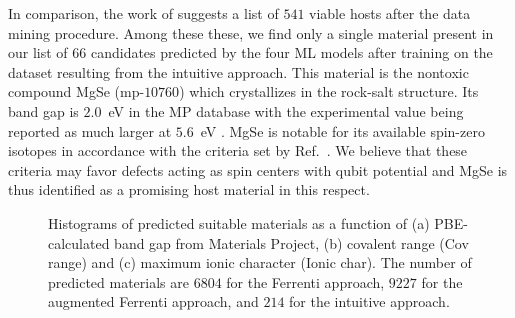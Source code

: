 \documentclass[superscriptaddress,unsortedaddress,
 amsmath,amssymb,
 aps,
]{revtex4-2}
\newcommand{\oliver}[1]{\textcolor{violet}{#1}}
\begin{document}
In comparison, the work of \citeauthor{Ferrenti2020} \cite{Ferrenti2020} suggests a list of $541$ viable hosts after the data mining procedure.  
Among these these, we find only a single material present in our list of $66$ candidates predicted by the four ML models after training on the dataset resulting from the intuitive approach. This material is the nontoxic compound MgSe (mp-$10760$) which crystallizes in the rock-salt structure. Its band gap is $2.0$~eV in the MP database with the experimental value being reported as much larger at $5.6$~eV  \cite{SaumGeorge1959}.  MgSe is notable for its available spin-zero isotopes in accordance with the criteria set by \citeauthor{Ferrenti2020} Ref.~\cite{Ferrenti2020}. We believe that these criteria may favor defects acting as spin centers with qubit potential and MgSe is thus identified as a promising host material in this respect.   

\begin{figure}%
    \centering
    \begin{subfigure}{1\textwidth}
        \centering
        
        \subcaption[]{}
    \end{subfigure}%

    
    \begin{subfigure}{1\textwidth}
        \centering
        
        \subcaption[]{}
    \end{subfigure}

    \begin{subfigure}{1\textwidth}
        \centering
        
        \subcaption[]{}
    \end{subfigure}
    
    \caption{Histograms of predicted suitable materials as a function of (a) PBE-calculated band gap from Materials Project, (b) covalent range (Cov range) and (c) maximum ionic character (Ionic char). The number of predicted materials are $6804$ for the Ferrenti approach, $9227$ for the augmented Ferrenti approach, and $214$ for the intuitive approach.}
    \label{fig:histogram}
\end{figure}
\end{document}
